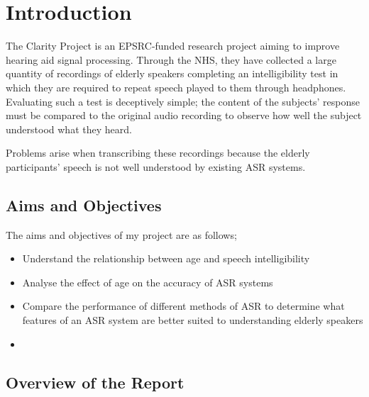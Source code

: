 \chapter{Introduction}\label{ch:introduction}

The Clarity Project is an EPSRC-funded research project aiming to improve hearing aid signal
processing.
Through the NHS, they have collected a large quantity of recordings of elderly speakers
completing an intelligibility test in which they are required to repeat speech played to them
through headphones.
Evaluating such a test is deceptively simple;
the content of the subjects' response must be compared to the original audio recording to observe
how well the subject understood what they heard.

Problems arise when transcribing these recordings because the elderly participants' speech is not
well understood by existing ASR systems.

\section{Aims and Objectives}\label{sec:aims-and-objectives}

The aims and objectives of my project are as follows;

\begin{itemize}
    \item Understand the relationship between age and speech intelligibility
    \item Analyse the effect of age on the accuracy of ASR systems
    \item Compare the performance of different methods of ASR to determine what features of an
    ASR system are better suited to understanding elderly speakers
    \item
\end{itemize}


\section{Overview of the Report}\label{sec:overview-of-the-report}

